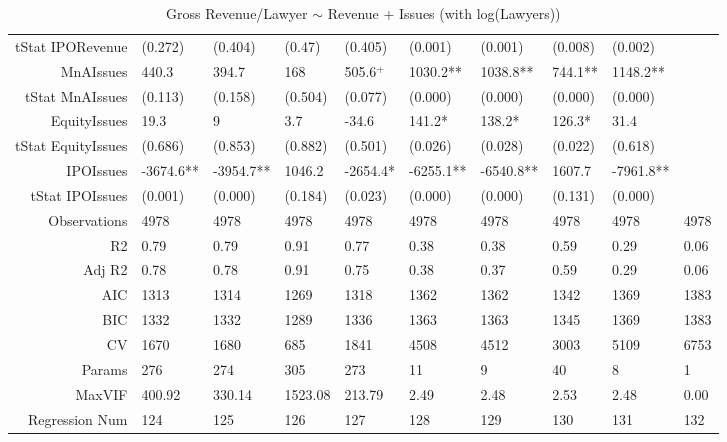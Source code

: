 \begin{table}[ht]
\begin{tabular}{rlllllllll}
  tStat IPORevenue & (0.272) & (0.404) & (0.47) & (0.405) & (0.001) & (0.001) & (0.008) & (0.002) &  \\ 
  MnAIssues & 440.3 & 394.7 & 168 & 505.6$^{+}$ & 1030.2** & 1038.8** & 744.1** & 1148.2** &  \\ 
  tStat MnAIssues & (0.113) & (0.158) & (0.504) & (0.077) & (0.000) & (0.000) & (0.000) & (0.000) &  \\ 
  EquityIssues & 19.3 & 9 & 3.7 & -34.6 & 141.2* & 138.2* & 126.3* & 31.4 &  \\ 
  tStat EquityIssues & (0.686) & (0.853) & (0.882) & (0.501) & (0.026) & (0.028) & (0.022) & (0.618) &  \\ 
  IPOIssues & -3674.6** & -3954.7** & 1046.2 & -2654.4* & -6255.1** & -6540.8** & 1607.7 & -7961.8** &  \\ 
  tStat IPOIssues & (0.001) & (0.000) & (0.184) & (0.023) & (0.000) & (0.000) & (0.131) & (0.000) &  \\ 
  Observations & 4978 & 4978 & 4978 & 4978 & 4978 & 4978 & 4978 & 4978 & 4978 \\ 
  R2 & 0.79 & 0.79 & 0.91 & 0.77 & 0.38 & 0.38 & 0.59 & 0.29 & 0.06 \\ 
  Adj R2 & 0.78 & 0.78 & 0.91 & 0.75 & 0.38 & 0.37 & 0.59 & 0.29 & 0.06 \\ 
  AIC & 1313 & 1314 & 1269 & 1318 & 1362 & 1362 & 1342 & 1369 & 1383 \\ 
  BIC & 1332 & 1332 & 1289 & 1336 & 1363 & 1363 & 1345 & 1369 & 1383 \\ 
  CV & 1670 & 1680 & 685 & 1841 & 4508 & 4512 & 3003 & 5109 & 6753 \\ 
  Params & 276 & 274 & 305 & 273 & 11 & 9 & 40 & 8 & 1 \\ 
  MaxVIF & 400.92 & 330.14 & 1523.08 & 213.79 & 2.49 & 2.48 & 2.53 & 2.48 & 0.00 \\ 
  Regression Num & 124 & 125 & 126 & 127 & 128 & 129 & 130 & 131 & 132 \\ 
   \hline
\end{tabular}
\caption{Gross Revenue/Lawyer $\sim$ Revenue + Issues (with log(Lawyers))} 
\end{table}
